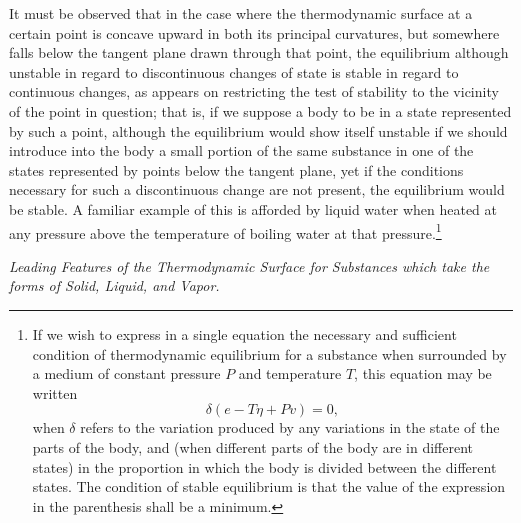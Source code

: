 \documentclass[11pt]{article}
\begin{document}
It must be observed that in the case where the thermodynamic surface at a certain point is concave upward in both its principal
curvatures, but somewhere falls below the tangent plane drawn through that point, the equilibrium although unstable in regard to discontinuous changes of state is stable in regard to continuous changes, as appears on restricting the test of stability to the vicinity of the point in question; that is, if we suppose a body to be in a state represented by such a point, although the equilibrium would show itself unstable if we should introduce into the body a small portion of the same substance in one of the states represented by points below the tangent plane, yet if the conditions necessary for such a discontinuous change are not present, the equilibrium would be stable. A familiar example of this is afforded by liquid water when heated at any pressure above the temperature of boiling water at that pressure.\footnote{If we wish to express in a single equation the necessary and sufficient condition of thermodynamic equilibrium for a substance when surrounded by a medium of constant pressure $P$ and temperature $T$, this equation may be written
\[
\delta(e-T\eta+Pv)=0,
\]
when $\delta$ refers to the variation produced by any variations in the state of the parts of the body, and (when different parts of the body are in different states) in the proportion in which the body is divided between the different states. The condition of stable equilibrium is that the value of the expression in the parenthesis shall be a minimum.}

\begin{center}
\itshape Leading Features of the Thermodynamic Surface for Substances which take the forms of Solid, Liquid, and Vapor.
\end{center}
\end{document}
